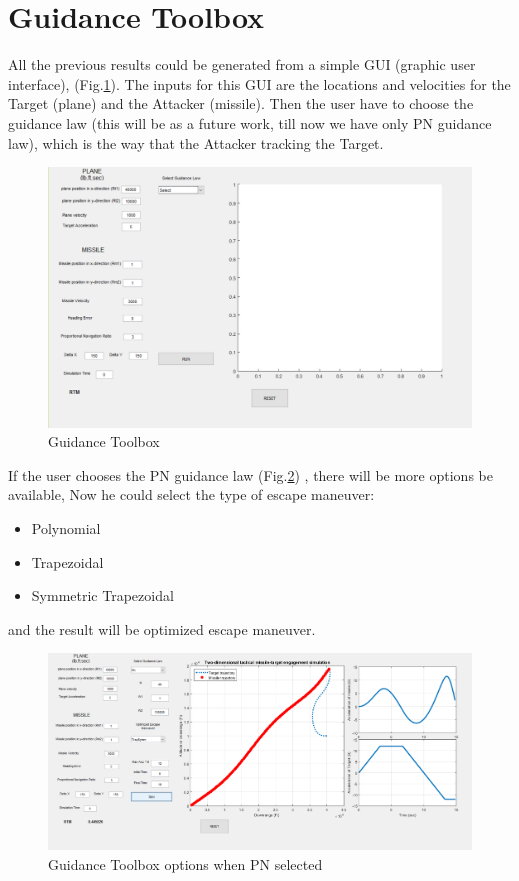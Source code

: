 
\section{Guidance Toolbox}

All the previous results could be generated from a simple GUI (graphic user interface), (Fig.\ref{Guidance Toolbox}).  The inputs for this GUI are the locations and velocities for the Target (plane) and the Attacker (missile). Then the user have to choose the guidance law (this will be as a future work, till now we have only PN guidance law), which is the way that the Attacker tracking the Target.

\begin{figure}[H]
	\centering
	\includegraphics[scale = 0.45]{fig/GUI.PNG}
	\caption{Guidance Toolbox}
	\label{Guidance Toolbox}
\end{figure}


If the user chooses the PN guidance law (Fig.\ref{Guidance Toolbox PN}) , there will be more options be available, Now he could select the type of escape maneuver:
\begin{itemize}
	\item Polynomial
	\item Trapezoidal
	\item Symmetric Trapezoidal
\end{itemize}

and the result will be optimized escape maneuver. 

\begin{figure}[H]
	\centering
	\includegraphics[scale = 0.4]{fig/guiPN.PNG}
	\caption{Guidance Toolbox options when PN selected}
	\label{Guidance Toolbox PN}
\end{figure}
  

